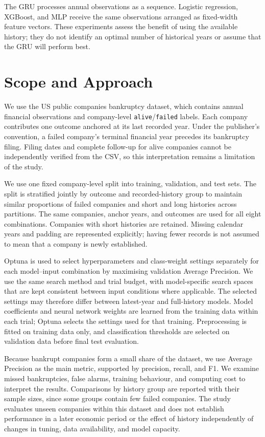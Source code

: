 The GRU processes annual observations as a sequence. Logistic regression, XGBoost, and MLP receive the same observations arranged as fixed-width feature vectors. These experiments assess the benefit of using the available history; they do not identify an optimal number of historical years or assume that the GRU will perform best.

\section{Scope and Approach}
We use the US public companies bankruptcy dataset, which contains annual financial observations and company-level \texttt{alive}/\texttt{failed} labels. Each company contributes one outcome anchored at its last recorded year. Under the publisher's convention, a failed company's terminal financial year precedes its bankruptcy filing. Filing dates and complete follow-up for alive companies cannot be independently verified from the CSV, so this interpretation remains a limitation of the study.

We use one fixed company-level split into training, validation, and test sets. The split is stratified jointly by outcome and recorded-history group to maintain similar proportions of failed companies and short and long histories across partitions. The same companies, anchor years, and outcomes are used for all eight combinations. Companies with short histories are retained. Missing calendar years and padding are represented explicitly; having fewer records is not assumed to mean that a company is newly established.

Optuna is used to select hyperparameters and class-weight settings separately for each model--input combination by maximising validation Average Precision. We use the same search method and trial budget, with model-specific search spaces that are kept consistent between input conditions where applicable. The selected settings may therefore differ between latest-year and full-history models. Model coefficients and neural network weights are learned from the training data within each trial; Optuna selects the settings used for that training. Preprocessing is fitted on training data only, and classification thresholds are selected on validation data before final test evaluation.

Because bankrupt companies form a small share of the dataset, we use Average Precision as the main metric, supported by precision, recall, and F1. We examine missed bankruptcies, false alarms, training behaviour, and computing cost to interpret the results. Comparisons by history group are reported with their sample sizes, since some groups contain few failed companies. The study evaluates unseen companies within this dataset and does not establish performance in a later economic period or the effect of history independently of changes in tuning, data availability, and model capacity.
